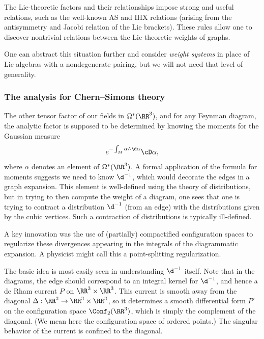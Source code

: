 \documentclass[10pt]{amsart}
\begin{document}
The Lie-theoretic factors and their relationships impose strong and useful relations,
such as the well-known AS and IHX relations (arising from the antisymmetry and Jacobi relation of the Lie brackets). 
These rules allow one to discover nontrivial relations between the Lie-theoretic weights of graphs.

\begin{rmk}
One can abstract this situation further and consider {\em weight systems} in place of Lie algebras with a nondegenerate pairing,
but we will not need that level of generality.
\end{rmk}

\subsubsection{The analysis for Chern--Simons theory}

The other tensor factor of our fields in $\Omega^*(\RR^3)$,
and for any Feynman diagram, 
the analytic factor is supposed to be determined by knowing the moments for the Gaussian measure 
\[
e^{-\int_M \alpha \wedge \d\alpha} \cD \alpha,
\]
where $\alpha$ denotes an element of $\Omega^*(\RR^3)$.
A formal application of the formula for moments suggests we need to know $\d^{-1}$,
which would decorate the edges in a graph expansion.
This element is well-defined using the theory of distributions, 
but in trying to then compute the weight of a diagram, 
one sees that one is trying to contract a distribution $\d^{-1}$ (from an edge) with the distributions
given by the cubic vertices.
Such a contraction of distributions is typically ill-defined.

A key innovation was the use of (partially) compactified configuration spaces to regularize these divergences appearing in the integrals of the diagrammatic expansion.
A physicist might call this a point-splitting regularization.

The basic idea is most easily seen in understanding $\d^{-1}$ itself.
Note that in the diagrams, the edge should correspond to an integral kernel for $\d^{-1}$,
and hence a de Rham current $P$ on $\RR^3 \times \RR^3$.
This current is smooth away from the diagonal $\Delta: \RR^3 \to \RR^3 \times \RR^3$,
so it determines a smooth differential form $P'$ on the configuration space $\Conf_2(\RR^3)$,
which is simply the complement of the diagonal.
(We mean here the configuration space of ordered points.)
The singular behavior of the current is confined to the diagonal.
\end{document}
